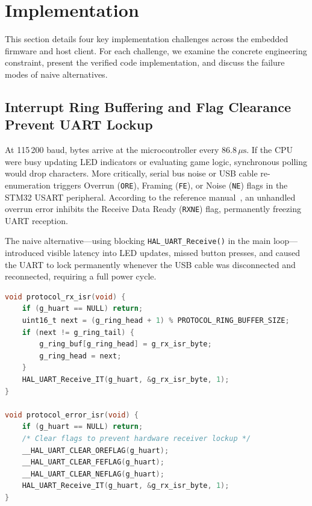 \section{Implementation}
\label{sec:impl}


This section details four key implementation challenges across the embedded firmware and host client. For each challenge, we examine the concrete engineering constraint, present the verified code implementation, and discuss the failure modes of naive alternatives.

\subsection{Interrupt Ring Buffering and Flag Clearance Prevent UART Lockup}

At 115\,200 baud, bytes arrive at the microcontroller every $86.8\,\mu\text{s}$. If the CPU were busy updating LED indicators or evaluating game logic, synchronous polling would drop characters. More critically, serial bus noise or USB cable re-enumeration triggers Overrun (\texttt{ORE}), Framing (\texttt{FE}), or Noise (\texttt{NE}) flags in the STM32 USART peripheral. According to the reference manual~\cite{rm0091}, an unhandled overrun error inhibits the Receive Data Ready (\texttt{RXNE}) flag, permanently freezing UART reception.

The naive alternative—using blocking \texttt{HAL\_UART\_Receive()} in the main loop—introduced visible latency into LED updates, missed button presses, and caused the UART to lock permanently whenever the USB cable was disconnected and reconnected, requiring a full power cycle.

\begin{lstlisting}[language=C, caption={Interrupt ring buffer and hardware error clearance (\texttt{protocol.c}).}, label=lst:ringbuf]
void protocol_rx_isr(void) {
    if (g_huart == NULL) return;
    uint16_t next = (g_ring_head + 1) % PROTOCOL_RING_BUFFER_SIZE;
    if (next != g_ring_tail) {
        g_ring_buf[g_ring_head] = g_rx_isr_byte;
        g_ring_head = next;
    }
    HAL_UART_Receive_IT(g_huart, &g_rx_isr_byte, 1);
}

void protocol_error_isr(void) {
    if (g_huart == NULL) return;
    /* Clear flags to prevent hardware receiver lockup */
    __HAL_UART_CLEAR_OREFLAG(g_huart);
    __HAL_UART_CLEAR_FEFLAG(g_huart);
    __HAL_UART_CLEAR_NEFLAG(g_huart);
    HAL_UART_Receive_IT(g_huart, &g_rx_isr_byte, 1);
}
\end{lstlisting}

